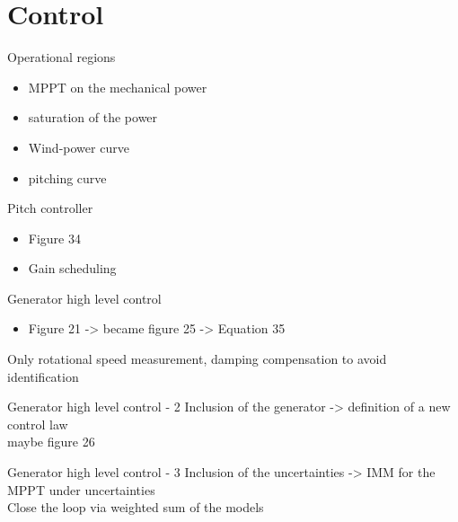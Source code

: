                                    

\section{Control}
\begin{frame}{Operational regions}
  \begin{itemize}
    \item MPPT on the mechanical power
    \item saturation of the power
    \item Wind-power curve
    \item pitching curve
  \end{itemize}
\end{frame}

\begin{frame}{Pitch controller}
  \begin{itemize}
    \item Figure 34
    \item Gain scheduling
  \end{itemize}
\end{frame}

\begin{frame}{Generator high level control}
  \begin{itemize}
    \item Figure 21 -> became figure 25 -> Equation 35
  \end{itemize}
  Only rotational speed measurement, damping compensation to avoid identification
\end{frame}

\begin{frame}{Generator high level control - 2}
  Inclusion of the generator -> definition of a new control law \\
  maybe figure 26
\end{frame}

\begin{frame}{Generator high level control - 3}
  Inclusion of the uncertainties -> IMM for the MPPT under uncertainties\\
  Close the loop via weighted sum of the models
\end{frame}

                                                        

